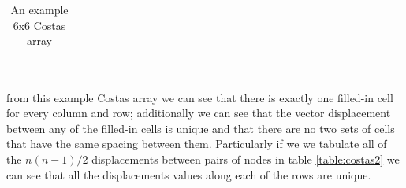 \documentclass[
10pt, %
a4paper, %
oneside, %
headinclude,footinclude, %
BCOR5mm, %
]{scrartcl}
\begin{document}
\begin{table}[h]
\centering
\begin{tabular}{|l|l|l|l|l|l|}
\hline
                         &                          & \cellcolor[HTML]{333333} &                          &                          &                          \\ \hline
                         &                          &                          &                          & \cellcolor[HTML]{333333} &                          \\ \hline
                         &                          &                          &                          &                          & \cellcolor[HTML]{333333} \\ \hline
\cellcolor[HTML]{333333} &                          &                          &                          &                          &                          \\ \hline
                         &                          &                          & \cellcolor[HTML]{333333} &                          &                          \\ \hline
                         & \cellcolor[HTML]{333333} &                          &                          &                          &                          \\ \hline
\end{tabular}
\caption{An example 6x6 Costas array}\label{table:costas1}
\end{table}
from this example Costas array we can see that there is exactly one filled-in cell for every column and row; additionally we can see that the vector displacement between any of the filled-in cells is unique and that there are no two sets of cells that have the same spacing between them. Particularly if we we tabulate all of the $n(n-1)/2$ displacements between pairs of nodes in table \ref{table:costas2} we can see that all the displacements values along each of the rows are unique.
\end{document}

